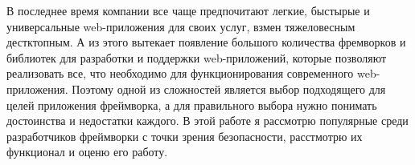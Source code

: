 В последнее время компании все чаще предпочитают легкие, быстырые и универсальные 
web-приложения для своих услуг, взмен тяжеловесным дестктопным. А из этого 
вытекает появление большого количества фремворков и библиотек для разработки и 
поддержки web-приложений, которые позволяют реализовать все, что необходимо для 
функционирования современного web-приложения.
Поэтому одной из сложностей является выбор подходящего для целей приложения фреймворка, 
а для правильного выбора нужно понимать достоинства и недостатки каждого. В этой работе я 
рассмотрю популярные среди разработчиков фреймворки с точки зрения безопасности, 
расстмотрю их функционал и оценю его работу.
